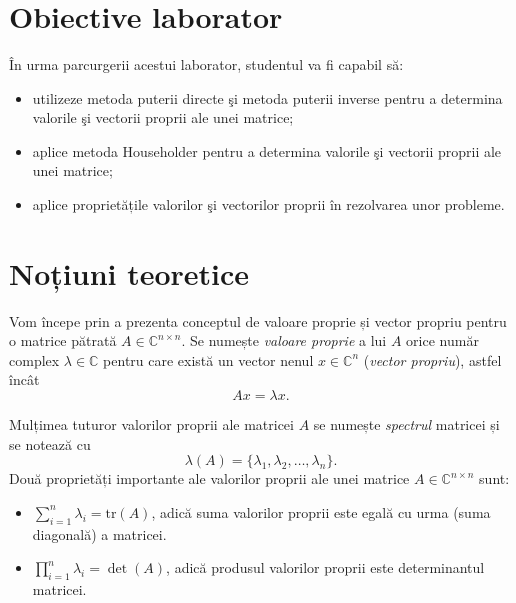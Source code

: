 \documentclass{exam}
\title{
	\textmd{\textbf{\MNLabTitle}}
	\author{}
        \date{}
}
\begin{document}
\begin{coverpages}

	\maketitle
        \thispagestyle{empty}
	\tableofcontents

\end{coverpages}

\section{Obiective laborator}

În urma parcurgerii acestui laborator, studentul va fi capabil să:

\begin{itemize}
	\item utilizeze metoda puterii directe şi metoda puterii inverse pentru a determina valorile şi vectorii proprii ale unei matrice;
	\item aplice metoda Householder pentru a determina valorile şi vectorii proprii ale unei matrice;
	\item aplice proprietățile valorilor şi vectorilor proprii în rezolvarea unor probleme.
\end{itemize}



\section{Noțiuni teoretice}

Vom începe prin a prezenta conceptul de valoare proprie și vector propriu pentru o matrice pătrată
$A \in \mathbb{C}^{n\times n}$. Se numește \emph{valoare proprie} a lui $A$ orice număr complex
$\lambda \in \mathbb{C}$ pentru care există un vector nenul $x \in \mathbb{C}^{n}$ (\emph{vector propriu}), astfel încât
\[
	A x = \lambda x.
\]

Mulțimea tuturor valorilor proprii ale matricei $A$ se numește \emph{spectrul} matricei și se notează cu
\[
	\lambda(A) = \{ \lambda_1, \lambda_2, \ldots, \lambda_n\}.
\]
Două proprietăți importante ale valorilor proprii ale unei matrice $A\in\mathbb{C}^{n\times n}$ sunt:
\begin{itemize}
	\item \(\displaystyle \sum\limits_{i=1}^n \lambda_{i} = \mathrm{tr}(A)\), adică suma valorilor proprii este egală cu urma (suma diagonală) a matricei.
	\item \(\displaystyle \prod\limits_{i=1}^n \lambda_{i} = \det(A)\), adică produsul valorilor proprii este determinantul matricei.
\end{itemize}
\end{document}
